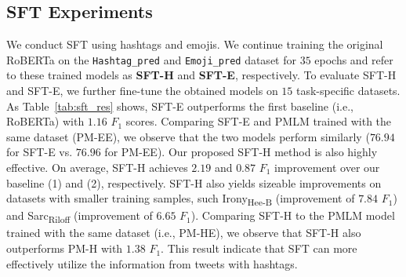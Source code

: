 \vspace{-15pt}
\subsection{SFT Experiments}\label{subsec:sft_result}


We conduct SFT using hashtags and emojis. We continue training the original RoBERTa on the \texttt{Hashtag\_pred} and \texttt{Emoji\_pred} dataset for $35$ epochs and refer to these trained models as \textbf{SFT-H} and \textbf{SFT-E}, respectively. 
To evaluate SFT-H and SFT-E, we further fine-tune the obtained models on $15$ task-specific datasets. 
As Table~\ref{tab:sft_res} shows, SFT-E outperforms the first baseline (i.e., RoBERTa) with $1.16$ $F_1$ scores. Comparing SFT-E and PMLM trained with the same dataset (PM-EE), we observe that the two models perform similarly ($76.94$ for SFT-E vs. $76.96$ for PM-EE). Our proposed SFT-H method is also highly effective. On average, SFT-H achieves $2.19$ and $0.87$ $F_1$ improvement over our baseline (1) and (2), respectively. SFT-H also yields sizeable improvements on datasets with smaller training samples, such Irony\textsubscript{Hee-B} (improvement of $7.84$ $F_1$) and Sarc\textsubscript{Riloff} (improvement of $6.65$ $F_1$). Comparing SFT-H to the PMLM model trained with the same dataset (i.e., PM-HE), we observe that SFT-H also outperforms PM-H with $1.38$ $F_1$. This result indicate that SFT can more effectively utilize the information from tweets with hashtags.




 

